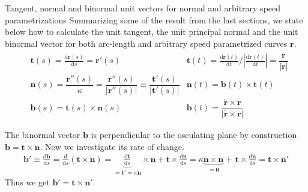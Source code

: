\documentclass[11pt, DINA4, fleqn]{amsart}
\def\df{\mathrm{d}\xspace}
\newcommand{\dd}[2]{\frac{\df#1}{\df#2}}
\def\vr{\boldsymbol{r}\xspace}
\def\vrd{\dot{\vr}\xspace}
\def\vrdd{\ddot{\vr}\xspace}
\def\vrp{{\vr}'\xspace}
\def\vrpp{{\vr}''\xspace}
\def\vbp{{\vb}'\xspace}
\def\vt{\boldsymbol{t}\xspace}
\def\vn{\boldsymbol{n}\xspace}
\def\vb{\boldsymbol{b}\xspace}
\begin{document}
\begin{mybox_tc3}{{Tangent, normal and binormal unit vectors for normal and arbitrary speed parametrizations}}
	Summarizing some of the result from the last sections, we state below how to calculate the unit tangent, the unit principal normal and the unit binormal vector for both arc-length and arbitrary speed parametrized curves $\vr$.
	\begin{align}
	&\vt(s) = \dd{\vr(s)}{s} = \vrp(s)
	&\vt(t) = \dd{\vr(t)}{t} \biggl/ \left|\dd{\vr(t)}{t}\right| = \dfrac{\vrd}{|\vrd|} \\
	&\vn(s) = \dfrac{\vrpp(s)}{\kappa} = \dfrac{\vrpp(s)}{|\vrpp(s)|} \equiv \dfrac{\vt'(s)}{|\vt'(s)|}
	& \vn(t) = \vb(t) \times \vt(t) \\
	&\vb(s) = \vt(s)\times \vn(s)
	&\vb(t) =  \dfrac{\vrd \times \vrdd}{|\vrd \times \vrdd|}
	\end{align}
\end{mybox_tc3}

The binormal vector $\vb$ is perpendicular to the osculating plane by construction $\vb = \vt \times \vn$.
Now we investigate its rate of change.
\begin{align}
\vbp \equiv \dd{\vb}{s} = \dd{}{s}\left(\vt \times \vn\right) = \underbrace{\dd{\vt}{s}}_{=\vt' = \kappa \vn} \times \vn + \vt \times \dd{\vn}{s}
= \kappa \underbrace{\vn\times\vn}_{=\boldsymbol{0}} + \, \vt \times \dd{\vn}{s} = \vt \times \vn'
\end{align}
Thus we get $\vb' = \vt \times \vn'$.
\end{document}
